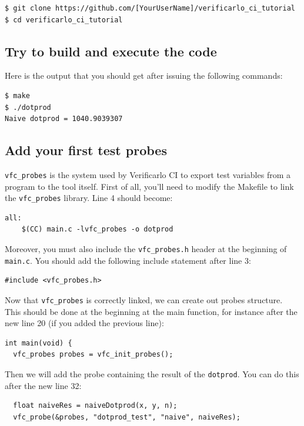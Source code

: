 \begin{verbatim}
$ git clone https://github.com/[YourUserName]/verificarlo_ci_tutorial
$ cd verificarlo_ci_tutorial
\end{verbatim}

\subsection{Try to build and execute the code}

Here is the output that you should get after issuing the following commands:

\begin{verbatim}
$ make
$ ./dotprod
Naive dotprod = 1040.9039307
\end{verbatim}

\subsection{Add your first test probes}

\texttt{vfc_probes} is the system used by Verificarlo CI to export test variables from a program to the tool itself. First of all, you'll need to modify the Makefile to link the \texttt{vfc_probes} library. Line 4 should become:

\begin{verbatim}
all:
	$(CC) main.c -lvfc_probes -o dotprod
\end{verbatim}

Moreover, you must also include the \texttt{vfc_probes.h} header at the
beginning of \texttt{main.c}. You should add the following include
statement after line 3:

\begin{verbatim}
#include <vfc_probes.h>
\end{verbatim}

Now that \texttt{vfc_probes} is correctly linked, we can create out probes structure. This should be done at the beginning at the main function, for instance after the new line 20 (if you added the previous line):

\begin{verbatim}
int main(void) {
  vfc_probes probes = vfc_init_probes();
\end{verbatim}

Then we will add the probe containing the result of the \texttt{dotprod}. You can do this after the new line 32:

\begin{verbatim}
  float naiveRes = naiveDotprod(x, y, n);
  vfc_probe(&probes, "dotprod_test", "naive", naiveRes);
\end{verbatim}

